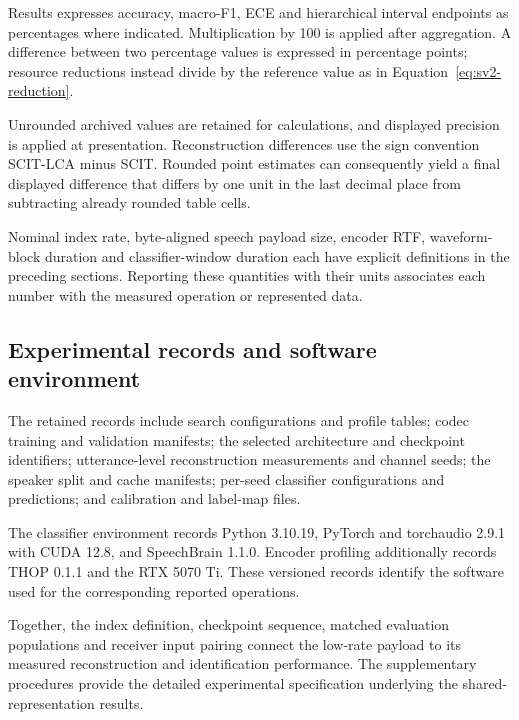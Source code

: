 Results expresses accuracy, macro-F1, ECE and hierarchical interval endpoints as percentages where indicated. Multiplication by 100 is applied after aggregation. A difference between two percentage values is expressed in percentage points; resource reductions instead divide by the reference value as in Equation~\ref{eq:sv2-reduction}.

Unrounded archived values are retained for calculations, and displayed precision is applied at presentation. Reconstruction differences use the sign convention SCIT-LCA minus SCIT. Rounded point estimates can consequently yield a final displayed difference that differs by one unit in the last decimal place from subtracting already rounded table cells.

Nominal index rate, byte-aligned speech payload size, encoder RTF, waveform-block duration and classifier-window duration each have explicit definitions in the preceding sections. Reporting these quantities with their units associates each number with the measured operation or represented data.

\subsection{Experimental records and software environment}
The retained records include search configurations and profile tables; codec training and validation manifests; the selected architecture and checkpoint identifiers; utterance-level reconstruction measurements and channel seeds; the speaker split and cache manifests; per-seed classifier configurations and predictions; and calibration and label-map files.

The classifier environment records Python 3.10.19, PyTorch and torchaudio 2.9.1 with CUDA 12.8, and SpeechBrain 1.1.0. Encoder profiling additionally records THOP 0.1.1 and the RTX 5070 Ti. These versioned records identify the software used for the corresponding reported operations.

Together, the index definition, checkpoint sequence, matched evaluation populations and receiver input pairing connect the low-rate payload to its measured reconstruction and identification performance. The supplementary procedures provide the detailed experimental specification underlying the shared-representation results.
